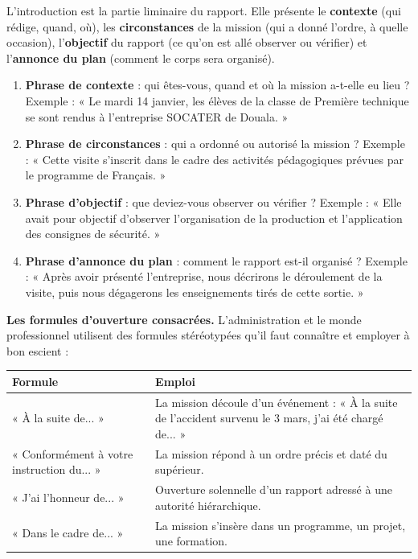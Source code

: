 \documentclass[11pt]{article}
\newcommand{\cle}[1]{{\popxbold\color{popdark}#1}}
\begin{document}
\begin{definition}
L'\cle{introduction} est la partie liminaire du rapport. Elle présente le \textbf{contexte} (qui rédige, quand, où), les \textbf{circonstances} de la mission (qui a donné l'ordre, à quelle occasion), l'\textbf{objectif} du rapport (ce qu'on est allé observer ou vérifier) et l'\textbf{annonce du plan} (comment le corps sera organisé).
\end{definition}

\begin{methode}
\begin{enumerate}
\item \textbf{Phrase de contexte} : qui êtes-vous, quand et où la mission a-t-elle eu lieu ? Exemple : « Le mardi 14 janvier, les élèves de la classe de Première technique se sont rendus à l'entreprise SOCATER de Douala. »
\item \textbf{Phrase de circonstances} : qui a ordonné ou autorisé la mission ? Exemple : « Cette visite s'inscrit dans le cadre des activités pédagogiques prévues par le programme de Français. »
\item \textbf{Phrase d'objectif} : que deviez-vous observer ou vérifier ? Exemple : « Elle avait pour objectif d'observer l'organisation de la production et l'application des consignes de sécurité. »
\item \textbf{Phrase d'annonce du plan} : comment le rapport est-il organisé ? Exemple : « Après avoir présenté l'entreprise, nous décrirons le déroulement de la visite, puis nous dégagerons les enseignements tirés de cette sortie. »
\end{enumerate}
\end{methode}

\textbf{Les formules d'ouverture consacrées.} L'administration et le monde professionnel utilisent des formules stéréotypées qu'il faut connaître et employer à bon escient :

\begin{center}
\begin{tabularx}{\linewidth}{|l|X|}\hline
\rowcolor{popblueL} \textbf{Formule} & \textbf{Emploi} \\ \hline
« À la suite de... » & La mission découle d'un événement : « À la suite de l'accident survenu le 3 mars, j'ai été chargé de... » \\ \hline
« Conformément à votre instruction du... » & La mission répond à un ordre précis et daté du supérieur. \\ \hline
« J'ai l'honneur de... » & Ouverture solennelle d'un rapport adressé à une autorité hiérarchique. \\ \hline
« Dans le cadre de... » & La mission s'insère dans un programme, un projet, une formation. \\ \hline
\end{tabularx}
\end{center}
\end{document}

